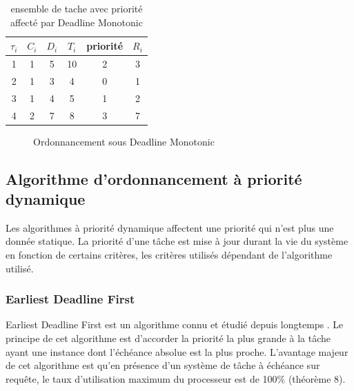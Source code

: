 \begin{table}[h]
\begin{center}
\begin{tabular}{|c|c|c|c|c|c|}
 \hline$\tau_i$ & $C_i$ & $D_i$ & $T_i$ & priorité & $R_i$\\ 
 \hline1 & 1 & 5 & 10 & 2 & 3\\ 
 \hline2 & 1 & 3 & 4 & 0 & 1\\ 
 \hline3 & 1 & 4 & 5 & 1 & 2\\ 
 \hline4 & 2 & 7 & 8 & 3 & 7\\ 
 \hline
 \end{tabular}
\end{center}
\caption{ensemble de tache avec priorité affecté par Deadline Monotonic} \label{tab:exempleDM}
\end{table}
\vspace{1cm}

\begin{figure}[h]
\begin{center}
\begin{RTGrid}[height=4cm,width=12cm,labelsize=8pt,numbersize=6]{4}{10}



\end{RTGrid}
\caption{Ordonnancement sous Deadline Monotonic} \label{fig:exempleDM}
\end{center}
\end{figure}
\vspace{1cm}

\subsection{Algorithme d’ordonnancement à priorité dynamique}
\vspace{-1cm}
Les algorithmes à priorité dynamique affectent une priorité qui n'est plus une donnée statique.
La priorité d'une tâche est mise à jour durant la vie du système en fonction de certains critères, les critères utilisés dépendant de l'algorithme utilisé.

\subsubsection{Earliest Deadline First\cite{LL73}}
\vspace{-1cm}
Earliest Deadline First est un algorithme connu et étudié depuis longtemps \cite{LL73, Der74, Hor74}. Le principe de cet algorithme est d'accorder la priorité la plus grande à la tâche ayant une instance dont l'échéance absolue est la plus proche.
L'avantage majeur de cet algorithme est qu'en présence d'un système de tâche à échéance sur requête, le taux d'utilisation maximum du processeur est de 100\% (théorème 8).

